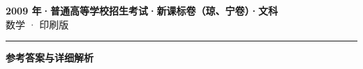 \documentclass[zihao=5, a4paper]{ctexart}
\begin{document}
\begin{center}
  {\Large\bfseries 2009 年·普通高等学校招生考试·新课标卷（琼、宁卷）·文科}\\[4pt]
  {\large 数学 · 印刷版}
\end{center}
\medskip
{}

\par\bigskip\hrule\bigskip
{}
\begin{center}{\large\bfseries 参考答案与详细解析}\end{center}
\smallskip

\end{document}
